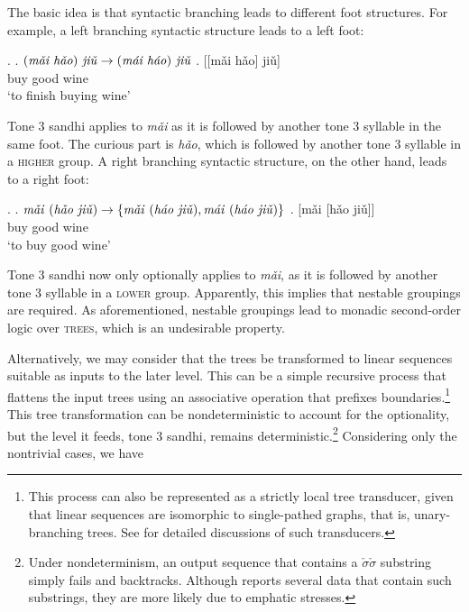 \documentclass[12pt, a4paper]{report}
\newcommand{\textemph}[1]{\textsc{#1}}
\newcommand{\textform}[1]{\textit{#1}}
\newcommand{\textgls}[1]{`#1'}
\begin{document}
The basic idea is that syntactic branching leads to different foot
structures.  For example, a left branching syntactic structure leads
to a left foot:

\ex.
\a. \(\text{(\textform{mǎi hǎo}) \textform{jiǔ}} \to
\text{(\textform{mái háo}) \textform{jiǔ}}\)
\bg. [[mǎi hǎo] jiǔ]\\
\phantom{[[}buy good wine\\
\trans\textgls{to finish buying wine}

Tone 3 sandhi applies to \textform{mǎi} as it is followed by another
tone 3 syllable in the same foot.  The curious part is \textform{hǎo},
which is followed by another tone 3 syllable in a \textemph{higher}
group.  A right branching syntactic structure, on the other hand,
leads to a right foot:

\ex.
\a. \(\text{\textform{mǎi} (\textform{hǎo jiǔ})} \to
\{\text{\textform{mǎi} (\textform{háo jiǔ})},
\text{\textform{mái} (\textform{háo jiǔ})}\}\)
\bg. [mǎi [hǎo jiǔ]]\\
\phantom{[}buy \phantom{[}good wine\\
\trans\textgls{to buy good wine}

Tone 3 sandhi now only optionally applies to \textform{mǎi}, as it is
followed by another tone 3 syllable in a \textemph{lower} group.
Apparently, this implies that nestable groupings are required.  As
aforementioned, nestable groupings lead to monadic second-order logic
over \textemph{trees}, which is an undesirable property.

Alternatively, we may consider that the trees be transformed to linear
sequences suitable as inputs to the later level.  This can be a simple
recursive process that flattens the input trees using an associative
operation that prefixes boundaries.\footnote{This process can also be
  represented as a strictly local tree transducer, given that linear
  sequences are isomorphic to single-pathed graphs, that is,
  unary-branching trees.  See \textcite{ioj20qtt, jh20isltt} for
  detailed discussions of such transducers.}  This tree transformation
can be nondeterministic to account for the optionality, but the level
it feeds, tone 3 sandhi, remains deterministic.\footnote{Under
  nondeterminism, an output sequence that contains a
  \(\check{\sigma}\check{\sigma}\) substring simply fails and
  backtracks.  Although \textcite{c00tspcd} reports several data that
  contain such substrings, they are more likely due to emphatic
  stresses.}  Considering only the nontrivial cases, we have
\end{document}
